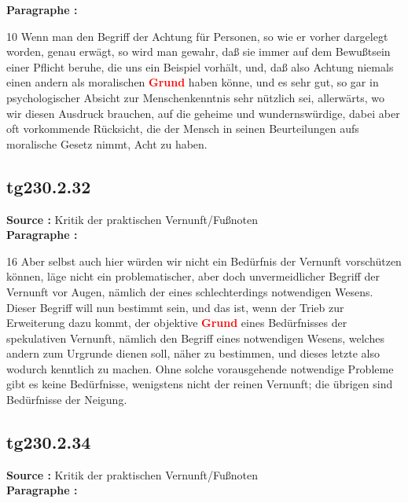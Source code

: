 \documentclass[a4paper,12pt,twoside]{book}
\newcommand{\match}[1]{\textcolor{red}{\textbf{#1}}}
\begin{document}
	\noindent\textbf{Paragraphe : }
	
	10 Wenn man den Begriff der Achtung für Personen, so wie er vorher dargelegt worden, genau erwägt, so wird man gewahr, daß sie immer auf dem Bewußtsein einer Pflicht beruhe, die uns ein Beispiel vorhält, und, daß also Achtung niemals einen andern als moralischen \match{Grund} haben könne, und es sehr gut, so gar in psychologischer Absicht zur Menschenkenntnis sehr nützlich sei, allerwärts, wo wir diesen Ausdruck brauchen, auf die geheime und wundernswürdige, dabei aber oft vorkommende Rücksicht, die der Mensch in seinen Beurteilungen aufs moralische Gesetz nimmt, Acht zu haben. 
	
	\subsection*{tg230.2.32} 
	\textbf{Source : }Kritik der praktischen Vernunft/Fußnoten\\  
	
	\noindent\textbf{Paragraphe : }
	
	16 Aber selbst auch hier würden wir nicht ein Bedürfnis der Vernunft vorschützen können, läge nicht ein problematischer, aber doch unvermeidlicher Begriff der Vernunft vor Augen, nämlich der eines schlechterdings notwendigen Wesens. Dieser Begriff will nun bestimmt sein, und das ist, wenn der Trieb zur Erweiterung dazu kommt, der objektive \match{Grund} eines Bedürfnisses der spekulativen Vernunft, nämlich den Begriff eines notwendigen Wesens, welches andern zum Urgrunde dienen soll, näher zu bestimmen, und dieses letzte also wodurch kenntlich zu machen. Ohne solche vorausgehende notwendige Probleme gibt es keine Bedürfnisse, wenigstens nicht der reinen Vernunft; die übrigen sind Bedürfnisse der Neigung. 
	
	\subsection*{tg230.2.34} 
	\textbf{Source : }Kritik der praktischen Vernunft/Fußnoten\\  
	
	\noindent\textbf{Paragraphe : }
	
\end{document}
